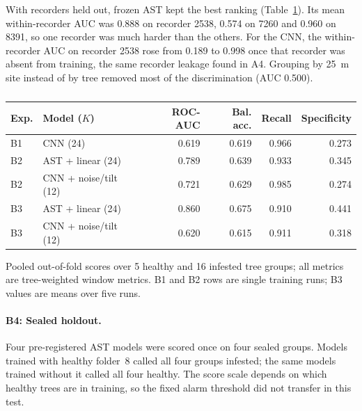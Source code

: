 With recorders held out, frozen AST kept the best ranking (Table~\ref{tab:ml_mil}). Its mean within-recorder AUC was 0.888 on recorder 2538, 0.574 on 7260 and 0.960 on 8391, so one recorder was much harder than the others. For the CNN, the within-recorder AUC on recorder 2538 rose from 0.189 to 0.998 once that recorder was absent from training, the same recorder leakage found in A4. Grouping by 25~m site instead of by tree removed most of the discrimination (AUC 0.500).

\begin{table}[htbp]
\centering
\color{black}
\caption{}
\label{tab:ml_mil}
\footnotesize
\setlength{\tabcolsep}{4pt}
\begin{tabular}{llrrrr}
\toprule
Exp. & Model ($K$) & ROC-AUC & Bal. acc. & Recall & Specificity \\
\midrule
B1 & CNN (24) & 0.619 & 0.619 & 0.966 & 0.273 \\
B2 & AST + linear (24) & 0.789 & 0.639 & 0.933 & 0.345 \\
B2 & CNN + noise/tilt (12) & 0.721 & 0.629 & 0.985 & 0.274 \\
B3 & AST + linear (24) & 0.860 & 0.675 & 0.910 & 0.441 \\
B3 & CNN + noise/tilt (12) & 0.620 & 0.615 & 0.911 & 0.318 \\
\bottomrule
\end{tabular}

\smallskip
\parbox{0.85\linewidth}{\footnotesize Pooled out-of-fold scores over 5 healthy and 16 infested tree groups; all metrics are tree-weighted window metrics. B1 and B2 rows are single training runs; B3 values are means over five runs.}
\end{table}

\paragraph{B4: Sealed holdout.} Four pre-registered AST models were scored once on four sealed groups. Models trained with healthy folder~8 called all four groups infested; the same models trained without it called all four healthy. The score scale depends on which healthy trees are in training, so the fixed alarm threshold did not transfer in this test.

